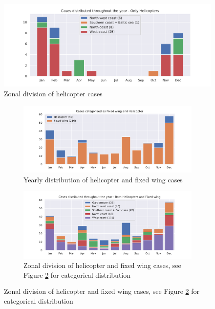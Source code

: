 \begin{figure}
    \centering
    \includegraphics[width=\textwidth]{Figures/Helisoner.pdf}
    \caption{Zonal division of helicopter cases}
    \label{fig:helisoner}
\end{figure}

\begin{figure}
    \begin{subfigure}{\textwidth}
    \centering
    \includegraphics[width=\textwidth]{Figures/helivsfw.pdf}
    \caption{Yearly distribution of helicopter and fixed wing cases}
    \label{fig:helivsfw}
    \end{subfigure}
    
    \begin{subfigure}{\textwidth}
    \centering
    \includegraphics[width=\textwidth]{Figures/soner.pdf}
    \caption{Zonal division of helicopter and fixed wing cases, see Figure \ref{fig:helivsfw} for categorical distribution}
    \label{fig:soner}
    \end{subfigure}
\end{figure}

